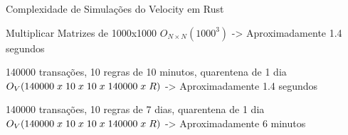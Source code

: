 \documentclass[10pt]{beamer}
\begin{document}
\begin{frame}[fragile]{Complexidade de Simulações do Velocity em Rust}	
	\begin{block}{Multiplicar Matrizes de 1000x1000}
		\textcolor{purplevs}{$O_{N \times N}(1000^3)$} -> \textcolor{purplevs}{Aproximadamente 1.4 segundos}
	\end{block}	
	
	\vspace{0.5cm}
	
	\begin{block}{140000 transações, 10 regras de 10 minutos, quarentena de 1 dia}
		\textcolor{purplevs}{$O_V(140000\hspace{0.1cm}x\hspace{0.1cm}10\hspace{0.1cm}x\hspace{0.1cm}10\hspace{0.1cm}x\hspace{0.1cm}140000\hspace{0.1cm}x\hspace{0.1cm}R)$} -> \textcolor{purplevs}{Aproximadamente 1.4 segundos}
	\end{block}	
	
	
	\vspace{0.5cm}
	
	\begin{block}{140000 transações, 10 regras de 7 dias, quarentena de 1 dia}
		\textcolor{purplevs}{$O_V(140000\hspace{0.1cm}x\hspace{0.1cm}10\hspace{0.1cm}x\hspace{0.1cm}10\hspace{0.1cm}x\hspace{0.1cm}140000\hspace{0.1cm}x\hspace{0.1cm}R)$} -> \textcolor{purplevs}{ Aproximadamente 6 minutos}
	\end{block}		
\end{frame}
\end{document}
